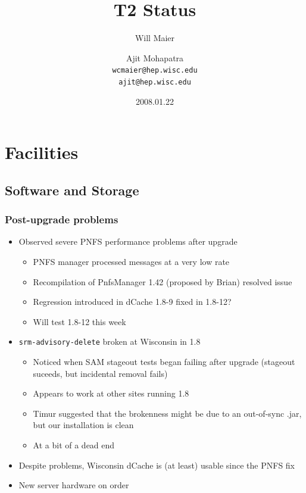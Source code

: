 \documentclass{beamer}
\title{T2 Status}
\author[Maier, Mohapatra]{
    Will Maier \and Ajit Mohapatra\\ 
    {\tt wcmaier@hep.wisc.edu}\\
    {\tt ajit@hep.wisc.edu}}
\institute[Wisconsin]{University of Wisconsin - High Energy Physics}
\date{2008.01.22}
\begin{document}
\begin{frame}
    \titlepage
\end{frame}


\section{Facilities}
\subsection{Software and Storage}
\begin{frame}
\frametitle{Post-upgrade problems}
\begin{itemize}
    \item Observed severe PNFS performance problems after upgrade
    \begin{itemize}
        \item PNFS manager processed messages at a very low rate
        \item Recompilation of PnfsManager 1.42 (proposed by Brian) resolved issue
        \item Regression introduced in dCache 1.8-9 fixed in 1.8-12?
        \item Will test 1.8-12 this week
    \end{itemize}
    \item {\tt srm-advisory-delete} broken at Wisconsin in 1.8
    \begin{itemize}
        \item Noticed when SAM stageout tests began failing after upgrade (stageout suceeds, but incidental removal fails)
        \item Appears to work at other sites running 1.8
        \item Timur suggested that the brokenness might be due to an out-of-sync .jar, but our installation is clean
        \item At a bit of a dead end
    \end{itemize}
    \item Despite problems, Wisconsin dCache is (at least) usable since the PNFS fix
    \item New server hardware on order
\end{itemize}
\end{frame}
\end{document}

